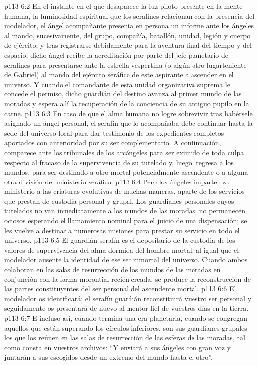 \vs p113 6:2 En el instante en el que desaparece la luz piloto presente en la mente humana, la luminosidad espiritual que los serafines relacionan con la presencia del modelador, el ángel acompañante presenta en persona un informe ante los ángeles al mando, sucesivamente, del grupo, compañía, batallón, unidad, legión y cuerpo de ejército; y tras registrarse debidamente para la aventura final del tiempo y del espacio, dicho ángel recibe la acreditación por parte del jefe planetario de serafines para presentarse ante la estrella vespertina (o algún otro lugarteniente de Gabriel) al mando del ejército seráfico de este aspirante a ascender en el universo. Y cuando el comandante de esta unidad organizativa suprema le concede el permiso, dicho guardián del destino avanza al primer mundo de las moradas y espera allí la recuperación de la conciencia de su antiguo pupilo en la carne.
\vs p113 6:3 \pc En caso de que el alma humana no logre sobrevivir tras habérsele asignado un ángel personal, el serafín que lo acompañaba debe continuar hasta la sede del universo local para dar testimonio de los expedientes completos aportados con anterioridad por su ser complementario. A continuación, comparece ante los tribunales de los arcángeles para ser eximido de toda culpa respecto al fracaso de la supervivencia de su tutelado y, luego, regresa a los mundos, para ser destinado a otro mortal potencialmente ascendente o a alguna otra división del ministerio seráfico.
\vs p113 6:4 \pc Pero los ángeles imparten su ministerio a las criaturas evolutivas de muchas maneras, aparte de los servicios que prestan de custodia personal y grupal. Los guardianes personales cuyos tutelados no van inmediatamente a los mundos de las moradas, no permanecen ociosos esperando el llamamiento nominal para el juicio de una dispensación; se les vuelve a destinar a numerosas misiones para prestar su servicio en todo el universo.
\vs p113 6:5 El guardián serafín es el depositario de la custodia de los valores de supervivencia del alma dormida del hombre mortal, al igual que el modelador ausente  la identidad de ese ser inmortal del universo. Cuando ambos colaboran en las salas de resurrección de los mundos de las moradas en conjunción con la forma morontial recién creada, se produce la reconstrucción de las partes constituyentes del ser personal del ascendente mortal.
\vs p113 6:6 El modelador os identificará; el serafín guardián reconstituirá vuestro ser personal y seguidamente os presentará de nuevo al mentor fiel de vuestros días en la tierra.
\vs p113 6:7 E incluso así, cuando termina una era planetaria, cuando se congregan aquellos que están superando los círculos inferiores, son sus guardianes grupales los que los reúnen en las salas de resurrección de las esferas de las moradas, tal como consta en vuestros archivos: “Y enviará a sus ángeles con gran voz y juntarán a sus escogidos desde un extremo del mundo hasta el otro”.
